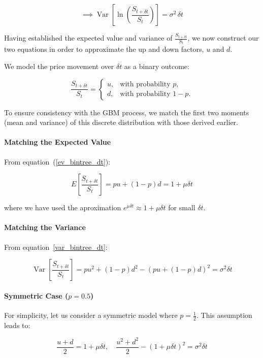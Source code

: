 \documentclass{article}
\begin{document}
    \begin{equation}
        \label{var_bintree_dt}
        \implies \operatorname{Var}\!\left[\ln\!\left(\frac{S_{t+\delta t}}{S_t}\right)\right] = \sigma^2\, \delta t
    \end{equation}

    Having established the expected value and variance of \( \frac{S_{t+\delta t}}{S_t} \), we now  construct our two equations in order to approximate the up and down factors, \( u \) and \( d \).

We model the price movement over \( \delta t \) as a binary outcome:

\[
    \frac{S_{t+\delta t}}{S_t} =
    \begin{cases}
        u, & \text{with probability } p, \\
        d, & \text{with probability } 1 - p.
    \end{cases}
\]

To ensure consistency with the GBM process, we match the first two moments (mean and variance) of this discrete distribution with those derived earlier.

\paragraph{Matching the Expected Value}
From equation~(\eqref{ev_bintree_dt}):

\[
    E\!\left[\frac{S_{t+\delta t}}{S_t}\right] = p u + (1 - p) d = 1 + \mu \delta t
\]

where we have used the aproximation \( e^{\mu \delta t} \approx 1 + \mu \delta t \) for small \( \delta t \).

\paragraph{Matching the Variance}
From equation~\eqref{var_bintree_dt}:

\[
    \operatorname{Var}\!\left[\frac{S_{t+\delta t}}{S_t}\right] = p u^2 + (1 - p) d^2 - (p u + (1 - p) d)^2 = \sigma^2 \delta t
\]

\paragraph{Symmetric Case (\( p = 0.5 \))}
For simplicity, let us consider a symmetric model where \( p = \frac{1}{2} \). This assumption leads to:

\[
    \frac{u + d}{2} = 1 + \mu \delta t, \quad \frac{u^2 + d^2}{2} - \left(1 + \mu \delta t\right)^2 = \sigma^2 \delta t
\]
\end{document}
